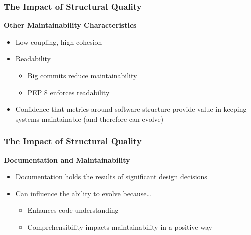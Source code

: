 \documentclass{beamer}
\begin{document}
\begin{frame}
  \frametitle{The Impact of Structural Quality}
  \textbf{Other Maintainability Characteristics}
  \begin{itemize}
    \vspace{0.35cm}
    \item Low coupling, high cohesion
    
    \vspace{0.35cm}
    \item Readability
    \begin{itemize}
      \item Big commits reduce maintainability
      \item PEP 8 enforces readability
    \end{itemize}
    
    \vspace{0.35cm}
    \item Confidence that metrics around software structure provide value in keeping systems maintainable (and therefore can evolve) %
  \end{itemize}
\end{frame}

\begin{frame}
  \frametitle{The Impact of Structural Quality}
  \textbf{Documentation and Maintainability}
  \begin{itemize}
    \vspace{0.35cm}
    \item Documentation holds the results of significant design decisions
    
    \vspace{0.35cm}
    \item Can influence the ability to evolve because\dots
    \begin{itemize}
      \item Enhances code understanding
      \item Comprehensibility impacts maintainability in a positive way  
    \end{itemize}
  \end{itemize}
\end{frame}
\end{document}
